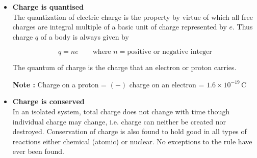 \begin{frame}[t]
	\frametitle{}
	
	\begin{itemize}
		\item<+-> \textbf{Charge is quantised} \\
		The quantization of electric charge is the property by virtue of which all free charges are integral multiple of a basic unit of charge represented by $e$. Thus charge $q$ of a body is always given by
		
		\vspace{0.5em}
		\[
		q = ne \qquad \text{where } n = \text{positive or negative integer}
		\]
		
		\vspace{0.5em}
		\pause
		The quantum of charge is the charge that an electron or proton carries.
		
		\vspace{0.3em}
		\pause
		\textbf{Note :} Charge on a proton = $(-)$ charge on an electron = $1.6 \times 10^{-19}\,\text{C}$
		
		\vspace{1em}
		\pause
		
		\item<+-> \textbf{Charge is conserved} \\
		In an isolated system, total charge does not change with time though individual charge may change, i.e. charge can neither be created nor destroyed. Conservation of charge is also found to hold good in all types of reactions either chemical (atomic) or nuclear. No exceptions to the rule have ever been found.
	\end{itemize}
	
\end{frame}
